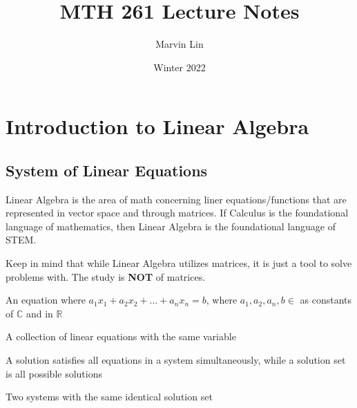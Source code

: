 \documentclass{report}
\title{MTH 261 Lecture Notes}
\author{Marvin Lin}
\date{Winter 2022}
\begin{document}
\maketitle

\tableofcontents

\chapter{Introduction to Linear Algebra}
\section{System of Linear Equations}

Linear Algebra is the area of math concerning liner equations/functions that are represented in vector space and through matrices. If Calculus is the foundational language of mathematics, then Linear Algebra is the foundational language of STEM.

\begin{remark}
Keep in mind that while Linear Algebra utilizes matrices, it is just a tool to solve problems with. The study is \textbf{NOT} of matrices.
\end{remark}

\begin{definition}
An equation where $a_1x_1+a_2x_2+\dots+a_nx_n=b$, where $a_1,a_2,a_n, b \in$ as constants of $\mathbb{C}$ and in $\mathbb{R}$
\end{definition}

\begin{definition}
A collection of linear equations with the same variable
\end{definition}

\begin{definition}
A solution satisfies all equations in a system simultaneously, while a solution set is all possible solutions
\end{definition}

\begin{definition}
Two systems with the same identical solution set
\end{definition}
\end{document}
